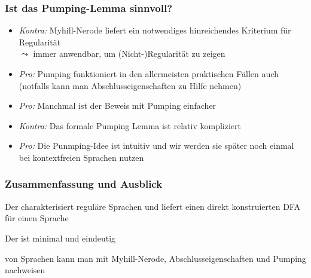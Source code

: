 \documentclass[onlymath]{beamer}
\begin{document}
\begin{frame}\frametitle{Ist das Pumping-Lemma sinnvoll?}

\begin{itemize}
\item \emph{Kontra:} Myhill-Nerode liefert ein notwendiges  hinreichendes Kriterium für Regularität\\
$\leadsto$ immer anwendbar, um (Nicht-)Regularität zu zeigen
\item \emph{Pro:} Pumping funktioniert in den allermeisten praktischen Fällen auch\\
(notfalls kann man Abschlusseigenschaften zu Hilfe nehmen)
\item \emph{Pro:} Manchmal ist der Beweis mit Pumping einfacher
\item \emph{Kontra:} Das formale Pumping Lemma ist relativ kompliziert
\item \emph{Pro:} Die Punmping-Idee ist intuitiv und wir werden sie später noch einmal bei kontextfreien Sprachen nutzen
\end{itemize}

\end{frame}

\begin{frame}\frametitle{Zusammenfassung und Ausblick}

Der  charakterisiert reguläre Sprachen und liefert einen direkt konstruierten DFA für einen Sprache
\bigskip

Der  ist minimal und eindeutig
\bigskip

 von Sprachen kann man mit Myhill-Nerode, Abschlusseigenschaften und Pumping nachweisen


\end{frame}
\end{document}
